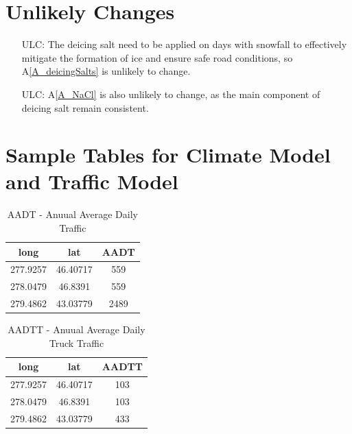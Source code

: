 \documentclass[12pt]{article}
\newcommand{\aref}[1]{A\ref{#1}}
\newcounter{lcnum} %
\newcounter{ulcnum} %
\begin{document}
\section{Unlikely Changes}    

\noindent \begin{itemize}
\item[ULC\refstepcounter{ulcnum}\theulcnum\label{ULC_saltSame}:] The deicing salt need to be applied on days with snowfall to effectively mitigate the formation of ice and ensure safe road conditions, so \aref{A_deicingSalts} is unlikely to change.

\item[ULC\refstepcounter{ulcnum}\theulcnum\label{ULC_NaCl}:] \aref{A_NaCl} is also unlikely to change, as the main component of deicing salt remain consistent.


\end{itemize}

\section{Sample Tables for Climate Model and Traffic Model}


\begin{table}[H]
\centering
\begin{tabular}{|c|c|c|}
\hline 
 long & lat & AADT \\

\hline
277.9257 & 46.40717 & 559 \\ \hline
278.0479 & 46.8391 & 559 \\ \hline
279.4862 & 43.03779 & 2489  \\ \hline
\end{tabular}
\caption{AADT - Anuual Average Daily Traffic}
\label{Table:AADT}
\end{table}

\begin{table}[H]
\centering
\begin{tabular}{|c|c|c|}
\hline 
 long & lat & AADTT \\

\hline
277.9257 & 46.40717 & 103 \\ \hline
278.0479 & 46.8391 & 103 \\ \hline
279.4862 & 43.03779 & 433  \\ \hline
\end{tabular}
\caption{AADTT - Anuual Average Daily Truck Traffic}
\label{Table:AADTT}
\end{table}
\end{document}
